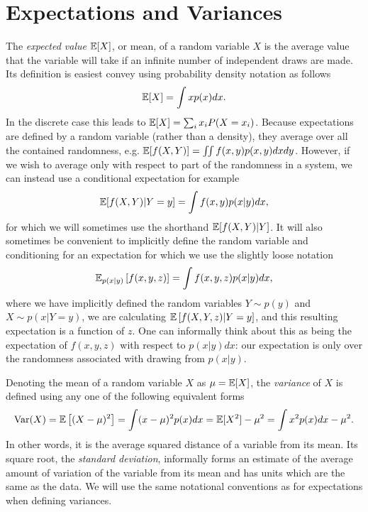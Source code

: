 \section{Expectations and Variances}
\label{sec:prob:expt}

The \emph{expected value} $\mathbb{E} [X]$, or mean, of a random variable $X$ is the average value that the variable
will take if an infinite number of independent draws are made.  Its definition is easiest convey using 
probability density notation as follows
\begin{align}
\label{eq:prob:expt}
\mathbb{E} [X] = \int x p(x)dx.
\end{align}
In the discrete case this leads to $\mathbb{E} [X] = \sum_{i} x_i P(X=x_i)$.  Because expectations are defined by a random
variable (rather than a density), they
average over all the contained randomness, e.g. $\mathbb{E} [f(X,Y)]=\iint f(x,y) p(x,y)dxdy$.  However, if we
wish to average only with respect to part of the randomness in a system, we can instead use a conditional
expectation for example
\begin{align}
\label{eq:prob:cond-expt}
\mathbb{E} [f(X,Y) | Y=y] = \int f(x,y) p(x|y) dx,
\end{align}
for which we will sometimes use the shorthand $\mathbb{E} [f(X,Y) | Y]$.
It will also sometimes be convenient to implicitly define the random variable and conditioning for an 
expectation for which we use the slightly loose notation
\begin{align}
\label{eq:prob:expt-2}
\mathbb{E}_{p(x|y)} \left[f(x,y,z)\right] = \int f(x,y,z) p(x|y) dx,
\end{align}
where we have implicitly defined the random variables $Y \sim p(y)$ and $X \sim p(x | Y=y)$,
we are calculating $\mathbb{E} \left[f(X,Y,z) | Y=y\right]$,
and this resulting expectation is a function of $z$.  One can informally think about this
as being the expectation of $f(x,y,z)$ with respect to $p(x|y)dx$:
our expectation is only over the randomness associated with drawing from $p(x|y)$.  

Denoting the mean of a random variable $X$ as $\mu=\mathbb{E} [X]$, the \emph{variance} of $X$
is defined using any one of the following equivalent forms
\begin{align}
\mathrm{Var} (X) = \mathbb{E} \left[(X-\mu)^2\right] = \int (x-\mu)^2 p(x)dx = \mathbb{E} [X^2] - \mu^2 =
\int x^2 p(x) dx - \mu^2.
\end{align}
In other words, it is the average squared distance of a variable from its mean.
Its square root, the \emph{standard deviation}, informally forms an estimate of the average
amount of variation of the variable from its mean and has units which are the same
as the data.  We will use the same notational conventions as for expectations when defining
variances.


